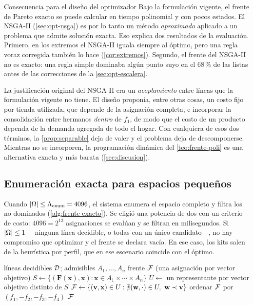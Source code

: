 \begin{hallazgo}{Consecuencia para el diseño del optimizador}
Bajo la formulación vigente, el frente de Pareto exacto se puede calcular en
tiempo polinomial y con pocos estados. El NSGA-II
(\cref{sec:opt-nsga}) es por lo tanto un método \emph{aproximado} aplicado a
un problema que admite solución exacta. Eso explica dos resultados de la
evaluación. Primero, en los extremos el NSGA-II iguala siempre al óptimo,
pero una regla voraz corregida también lo hace (\cref{cor:extremos}).
Segundo, el frente del NSGA-II no es exacto: una regla simple dominaba algún
punto suyo en el 68\,\% de las listas antes de las correcciones de la
\cref{sec:opt-escalera}.

La justificación original del NSGA-II era un \emph{acoplamiento} entre líneas
que la formulación vigente no tiene. El diseño proponía, entre otras cosas,
un costo fijo por tienda utilizada, que depende de la asignación completa, e
incorporar la consolidación entre hermanos \emph{dentro} de $f_1$, de modo que
el costo de un producto dependa de la demanda agregada de todo el hogar. Con
cualquiera de esos dos términos, la \cref{prop:separable} deja de valer y el
problema deja de descomponerse. Mientras no se incorporen, la programación
dinámica del \cref{teo:frente-poli} es una alternativa exacta y más barata
(\cref{sec:discusion}).
\end{hallazgo}

\subsection{Enumeración exacta para espacios pequeños}
\label{sec:opt-exacto}

Cuando $\left\lvert \Omega \right\rvert\leq\Lambda_{\mathrm{enum}}=4096$, el sistema enumera el
espacio completo y filtra los no dominados (\cref{alg:frente-exacto}). Se
eligió una potencia de dos con un criterio de costo: $4096=2^{12}$
asignaciones se evalúan y se filtran en milisegundos. Si $\left\lvert \Omega \right\rvert\leq1$
---ninguna línea decidible, o todas con un único candidato---, no hay
compromiso que optimizar y el frente se declara vacío. En ese caso, los kits
salen de la heurística por perfil, que en ese escenario coincide con el
óptimo.

\begin{algorithm}[htbp]
\caption{Frente exacto por enumeración y filtro de no dominancia}
\label{alg:frente-exacto}
\begin{algorithmic}[1]
\Require líneas decidibles $\mathcal{D}$; admisibles $A_1,\dots,A_n$
\Ensure frente $\mathcal{F}$ (una asignación por vector objetivo)
\State $S\gets\{(\mathbf{F}(\mathbf{x}),\mathbf{x}) : \mathbf{x}\in A_1\times\cdots\times A_n\}$
\State $U\gets$ un representante por vector objetivo distinto de $S$ 
\State $\mathcal{F}\gets\{(\mathbf{v},\mathbf{x})\in U : \nexists(\mathbf{w},\cdot)\in U,\ \mathbf{w}\prec\mathbf{v}\}$
\State ordenar $\mathcal{F}$ por $(f_1,-f_2,-f_3,-f_4)$
\State \Return $\mathcal{F}$
\end{algorithmic}
\end{algorithm}

